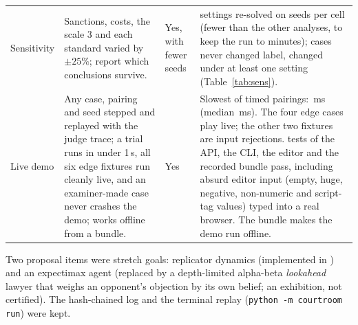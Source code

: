 \begin{table}[ht]
\begin{tabularx}{\textwidth}{@{}p{1.9cm}p{3.6cm}p{1.3cm}X@{}}
Sensitivity & Sanctions, costs, the scale 3 and each standard varied by $\pm25\%$; report which conclusions survive. & Yes, with fewer seeds & \SensVariations{} settings re-solved on \SensSeeds{} seeds per cell (fewer than the other analyses, to keep the run to minutes); \SensRobust{} cases never changed label, \SensFragile{} changed under at least one setting (Table~\ref{tab:sens}).\\
Live demo & Any case, pairing and seed stepped and replayed with the judge trace; a trial runs in under 1\,s, all six edge fixtures run cleanly live, and an examiner-made case never crashes the demo; works offline from a bundle. & Yes & Slowest of \TimedTrials{} timed pairings: \TrialMaxMs{}\,ms (median \TrialMedianMs{}\,ms). The four edge cases play live; the other two fixtures are input rejections. \TestsLiveDemo{} tests of the API, the CLI, the editor and the recorded bundle pass, including absurd editor input (empty, huge, negative, non-numeric and script-tag values) typed into a real browser. The bundle makes the demo run offline.\\
\bottomrule
\end{tabularx}
\end{table}

\begin{table}[ht]\centering
\caption{The four edge fixtures that are library cases, as measured (Bold against Careful, seed 0). The proposal fixed the expected outcome before any code: the empty docket and the defense-only case end at the directed-verdict review (DV-2) with the Defender winning, (the proposal also expected the Defender to spend nothing in the defense-only case; it spent the cost of the motion, see Table~\ref{tab:evalplan}); two equally credible, mutually exclusive witnesses cancel and the burden of proof decides for the Defender; and when every exhibit is defective, each objected exhibit is excluded and its presenter sanctioned, and the verdict equals the verdict on the admitted record.}\label{tab:edge}

\end{table}

Two proposal items were stretch goals: replicator dynamics (implemented in ) and an expectimax agent (replaced by a depth-limited alpha-beta \emph{lookahead} lawyer that weighs an opponent's objection by its own belief; an exhibition, not certified). The hash-chained log and the terminal replay (\texttt{python -m courtroom run}) were kept.

